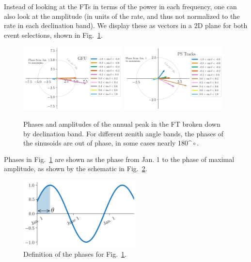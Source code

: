 Instead of looking at the FTs in terms of the power in each frequency, one can also look at the amplitude (in units of the rate, and thus not normalized to the rate in each declination band). We display these as vectors in a 2D plane for both event selections, shown in Fig.~\ref{fig:phasor}. 

\begin{figure}
    \centering
    \includegraphics[width=0.48\textwidth]{images/gfu_online_phasor.png}
    \includegraphics[width=0.48\textwidth]{images/ps_tracks_phasor.png}
    \caption{Phases and amplitudes of the annual peak in the FT broken down by declination band. For different zenith angle bands, the phases of the sinusoids are out of phase, in some cases nearly 180$\^{\circ}$. }
    \label{fig:phasor}
\end{figure}

Phases in Fig.~\ref{fig:phasor} are shown as the phase from Jan. 1 to the phase of maximal amplitude, as shown by the schematic in Fig.~\ref{fig:ft_schematic}.

\begin{figure}
    \centering
    \includegraphics[width=0.55\textwidth]{images/phase_schematic.png}
    \caption{Definition of the phases for Fig.~\ref{fig:phasor}.}
    \label{fig:ft_schematic}
\end{figure}
